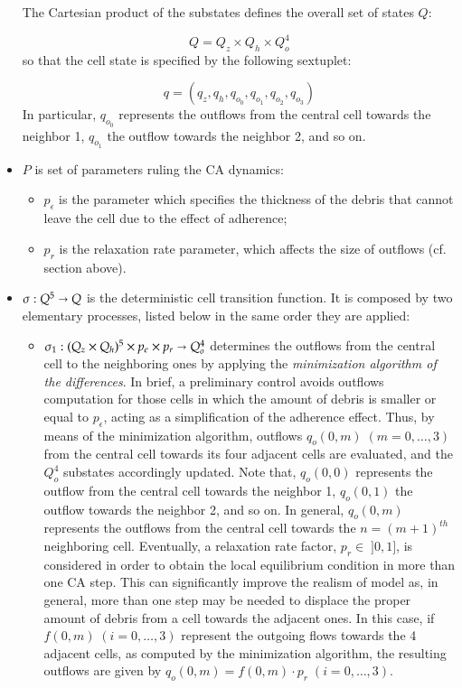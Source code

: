 \begin{itemize}
The Cartesian product of the substates defines the overall set of
states $Q$:

$$Q = Q_z \times Q_h \times Q_o^4$$
so that the cell state is specified by the following sextuplet:

$$ q = (q_z, q_h, q_{o_0}, q_{o_1}, q_{o_2}, q_{o_3})$$
In particular, $q_{o_0}$ represents the outflows from the central cell towards the neighbor 1, $q_{o_1}$ the outflow towards the neighbor 2, and so on.

\item   $P$ is set of parameters ruling the CA dynamics:

\begin{itemize}
    \item   $p_\epsilon$ is the parameter which specifies the thickness of the debris that cannot leave the cell due to the effect of adherence;
    \item   $p_r$ is the relaxation rate parameter, which affects the size of outflows (cf. section above).
\end{itemize}

\item $\sigma : Q^5 \shortrightarrow Q$ is the deterministic cell
  transition function. It is composed by two elementary processes,
  listed below in the same order they are applied:
\begin{itemize}
\item $\sigma_1 : (Q_z \times Q_h)^5 \times p_\epsilon \times
  p_r\shortrightarrow Q_o^4$ determines the outflows from the central
  cell to the neighboring ones by applying the \emph{minimization
    algorithm of the differences}. In brief, a preliminary control
  avoids outflows computation for those cells in which the amount of
  debris is smaller or equal to $p_\epsilon$, acting as a
  simplification of the adherence effect. Thus, by means of the
  minimization algorithm, outflows $q_o(0,m) \; (m=0,\ldots,3)$ from
  the central cell towards its four adjacent cells are evaluated, and
  the $Q_o^4$ substates accordingly updated. Note that, $q_o(0,0)$
  represents the outflow from the central cell towards the neighbor
  1, $q_o(0,1)$ the outflow towards the neighbor 2, and so on. In
  general, $q_o(0,m)$ represents the outflows from the central cell
  towards the $n=(m+1)^{th}$ neighboring cell. Eventually, a
  relaxation rate factor, $p_r \in \; ]0,1]$, is considered in order
      to obtain the local equilibrium condition in more than one CA
      step. This can significantly improve the realism of model as, in
      general, more than one step may be needed to displace the proper
      amount of debris from a cell towards the adjacent ones. In this
      case, if $f(0,m) \; (i=0, \ldots, 3)$ represent the outgoing
      flows towards the 4 adjacent cells, as computed by the
      minimization algorithm, the resulting outflows are given by
      $q_o(0,m)=f(0,m) \cdot p_r \; (i=0, \ldots, 3)$.


\end{itemize}
\end{itemize}
